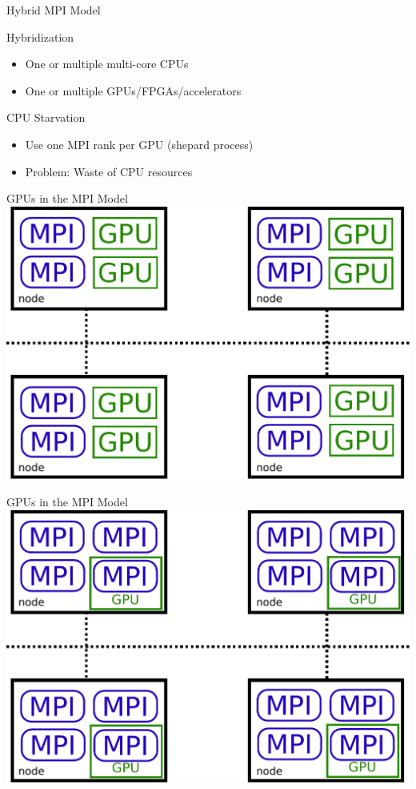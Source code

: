 \begin{frame}{Hybrid MPI Model}
  \begin{block}{Hybridization}
   \begin{itemize}
    \item One or multiple multi-core CPUs
    \item One or multiple GPUs/FPGAs/accelerators
   \end{itemize}
  \end{block}

  \begin{block}{CPU Starvation}
   \begin{itemize}
    \item Use one MPI rank per GPU (shepard process)
    \item Problem: Waste of CPU resources
   \end{itemize}
  \end{block}

\end{frame}


\begin{frame}{GPUs in the MPI Model}
  \includegraphics[width=1.0\textwidth]{figures/gpu-mpi}
\end{frame}


\begin{frame}{GPUs in the MPI Model}
  \includegraphics[width=1.0\textwidth]{figures/hybrid-mpi}
\end{frame}

